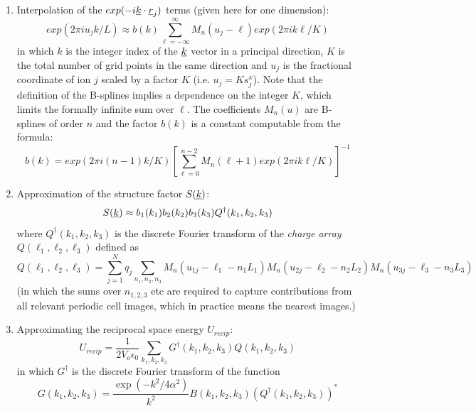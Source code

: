 \begin{enumerate}
\item Interpolation of the $exp(-i\mbox{$\underline{k}$}\cdot\mbox{$\underline{r}$}_{j})$ terms
(given here for one dimension):
\begin{equation}
exp(2\pi i u_{j}k/L) \approx b(k)
\sum_{\ell=-\infty}^{\infty} M_{n}(u_{j}-\ell) exp(2\pi i k\ell/K)
\end{equation}
in which $k$ is the integer index of the $\mbox{$\underline{k}$}$ vector in a
principal direction, $K$ is the total number of grid points in the
same direction and $u_{j}$ is the fractional coordinate of ion $j$
scaled by a factor $K$ (i.e. $u_{j}=K s_{j}^{x}$). Note that the
definition of the B-splines implies a dependence on the integer $K$,
which limits the formally infinite sum over $\ell$.  The coefficients
$M_{n}(u)$ are B-splines of order $n$ and the factor $b(k)$ is a
constant computable from the formula:
\begin{equation}
b(k)=exp(2\pi i (n-1)k/K)\left 
[\sum_{\ell=0}^{n-2} M_{n}(\ell+1) exp(2\pi i k\ell/K)\right ]^{-1}
\end{equation}
\item Approximation of the structure factor $S(\mbox{$\underline{k}$})$:
\begin{equation}
S(\mbox{$\underline{k}$}) \approx b_{1}(k_{1}) b_{2}(k_{2}) b_{3}(k_{3})
Q^{\dagger}(k_{1},k_{2},k_{3})
\end{equation}
where $Q^{\dagger}(k_{1},k_{2},k_{3})$ is the discrete Fourier transform of
the {\em charge array} $Q(\ell_{1},\ell_{2},\ell_{3})$ defined as
\begin{equation}
Q(\ell_{1},\ell_{2},\ell_{3})=\sum_{j=1}^{N}q_{j}\sum_{n_{1},n_{2},n_{3}}
M_{n}(u_{1j}-\ell_{1}-n_{1}L_{1})
M_{n}(u_{2j}-\ell_{2}-n_{2}L_{2})
M_{n}(u_{3j}-\ell_{3}-n_{3}L_{3})
\end{equation}
(in which the sums over $n_{1,2,3}$ etc are required to capture
contributions from all relevant periodic cell images, which in
practice means the nearest images.)
\item Approximating the reciprocal space energy $U_{recip}$:
\begin{equation}
U_{recip}=\frac{1}{2V_{o}\epsilon_{0}}\sum_{k_{1},k_{2},k_{3}}
G^{\dagger}(k_{1},k_{2},k_{3})Q(k_{1},k_{2},k_{3})
\end {equation}
in which $G^{\dagger}$ is the discrete Fourier transform of the function
\begin{equation}
G(k_{1},k_{2},k_{3})=
\frac{\exp(-k^{2}/4\alpha^{2})}{k^{2}}
B(k_{1},k_{2},k_{3})
(Q^{\dagger}(k_{1},k_{2},k_{3}))^{*}
\end{equation}

\end{enumerate}
